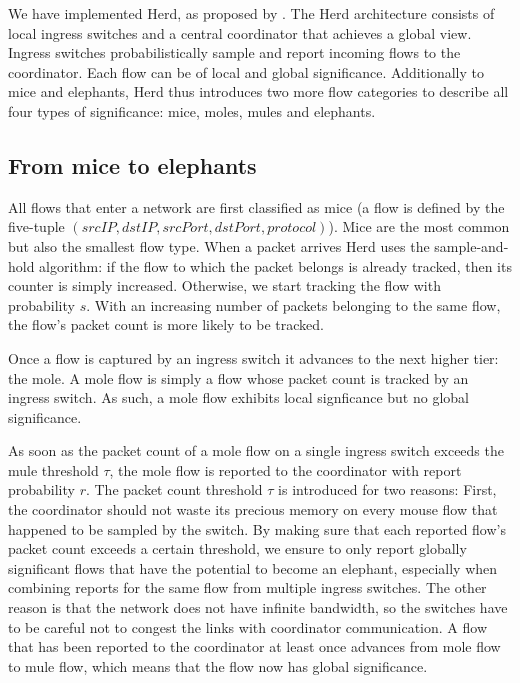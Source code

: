\documentclass[11pt,oneside,a4paper]{article}
\begin{document}
We have implemented Herd, as proposed by \cite{anon2019herd}. The Herd architecture consists of local ingress switches and a central coordinator that achieves a global view. Ingress switches probabilistically sample and report incoming flows to the coordinator.
Each flow can be of local and global significance. Additionally to mice and elephants, Herd thus introduces two more flow categories to describe all four types of significance: mice, moles, mules and elephants.

\subsection{From mice to elephants} \label{animals}

All flows that enter a network are first classified as mice (a flow is defined by the five-tuple $(srcIP, dstIP, srcPort, dstPort, protocol)$). Mice are the most common but also the smallest flow type. When a packet arrives Herd uses the sample-and-hold algorithm: if the flow to which the packet belongs is already tracked, then its counter is simply increased. Otherwise, we start tracking the flow with probability $s$. With an increasing number of packets belonging to the same flow, the flow's packet count is more likely to be tracked.

\noindent Once a flow is captured by an ingress switch it advances to the next higher tier: the mole. A mole flow is simply a flow whose packet count is tracked by an ingress switch. As such, a mole flow exhibits local signficance but no global significance.

As soon as the packet count of a mole flow on a single ingress switch exceeds the mule threshold $\tau$, the mole flow is reported to the coordinator with report probability $r$. The packet count threshold $\tau$ is introduced for two reasons: First, the coordinator should not waste its precious memory on every mouse flow that happened to be sampled by the switch. By making sure that each reported flow's packet count exceeds a certain threshold, we ensure to only report globally significant flows that have the potential to  become an elephant, especially when combining reports for the same flow from multiple ingress switches. The other reason is that the network does not have infinite bandwidth, so the switches have to be careful not to congest the links with coordinator communication. A flow that has been reported to the coordinator at least once advances from mole flow to mule flow, which means that the flow now has global significance.
\end{document}
